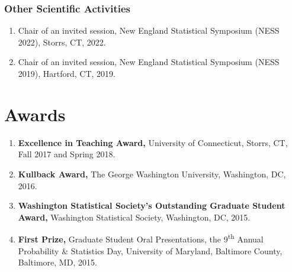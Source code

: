 \documentclass{res}
\begin{document}
\begin{resume}
\subsubsection{Other Scientific Activities}
\begin{enumerate}
	\item Chair of an invited session, New England Statistical 
	Symposium (NESS 2022), Storrs, CT, 2022.
	\item Chair of an invited session, New England Statistical 
	Symposium (NESS 2019), Hartford, CT, 2019.
\end{enumerate}

\section{Awards}
\begin{enumerate}
	\item {\bf Excellence in Teaching Award,} University of Connecticut, Storrs, CT, Fall 2017 and Spring 2018.
	\item {\bf Kullback Award,} The George Washington University, Washington, DC, 2016.
	\item {\bf Washington Statistical Society's Outstanding Graduate Student Award,} Washington Statistical Society, Washington, DC, 2015.
	\item {\bf First Prize,} Graduate Student Oral Presentations, the 9\textsuperscript{th} Annual Probability \& Statistics Day,  University of Maryland, Baltimore County, Baltimore, MD, 2015.
\end{enumerate}


\end{resume} 
\end{document}
